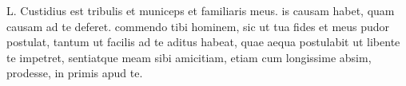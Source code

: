 


L. Custidius est tribulis et municeps et familiaris meus. is causam habet, quam causam ad te deferet. commendo tibi hominem, sic ut tua fides et meus pudor postulat,
tantum ut facilis ad te aditus habeat, quae aequa postulabit ut libente te impetret, sentiatque meam sibi amicitiam, etiam cum longissime absim, prodesse, in primis apud te.
